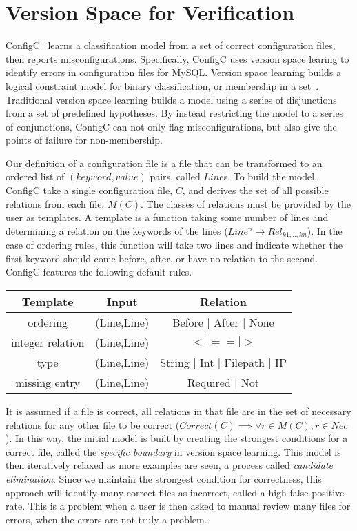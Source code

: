 \section{Version Space for Verification}

ConfigC~\cite{Santolucito2016} learns a classification model from a set of correct configuration files, then reports misconfigurations.
Specifically, ConfigC uses version space learing to identify errors in configuration files for MySQL.
Version space learning builds a logical constraint model for binary classification, or membership in a set~\cite{mitchell82}.
Traditional version space learning builds a model using a series of disjunctions from a set of predefined hypotheses.
By instead restricting the model to a series of conjunctions, ConfigC can not only flag misconfigurations, but also give the points of failure for non-membership.

Our definition of a configuration file is a file that can be transformed to an ordered list of $(keyword, value)$ pairs, called $Line$s.
To build the model, ConfigC take a single configuration file, $C$, and derives the set of all possible relations from each file, $M(C)$.
The classes of relations must be provided by the user as templates.
A template is a function taking some number of lines and determining a relation on the keywords of the lines ($Line^{n} \rightarrow Rel_{k1,..,kn}$).
In the case of ordering rules, this function will take two lines and indicate whether the first keyword should come before, after, or have no relation to the second. 
ConfigC features the following default rules.

\begin{center}
\begin{tabular} {|c |c |c |}
 \hline
 Template & Input  & Relation \\
\hline
 ordering & (Line,Line) & Before $\vert$ After $\vert$ None \\
 \hline
 integer relation & (Line,Line)  & $< | == | >$  \\
\hline
 type & (Line,Line)  & String $\vert$ Int $\vert$ Filepath $\vert$ IP  \\
\hline
 missing entry & (Line,Line) & Required $\vert$ Not \\
\hline
\end{tabular}
\end{center}

It is assumed if a file is correct, all relations in that file are in the set of necessary relations for any other file to be correct ($Correct(C) \implies \forall r \in M(C), r \in Nec$).
In this way, the initial model is built by creating the strongest conditions for a correct file, called the \textit{specific boundary} in version space learning.
This model is then iteratively relaxed as more examples are seen, a process called \textit{candidate elimination}.
Since we maintain the strongest condition for correctness, this approach will identify many correct files as incorrect, called a high false positive rate.
This is a problem when a user is then asked to manual review many files for errors, when the errors are not truly a problem.

